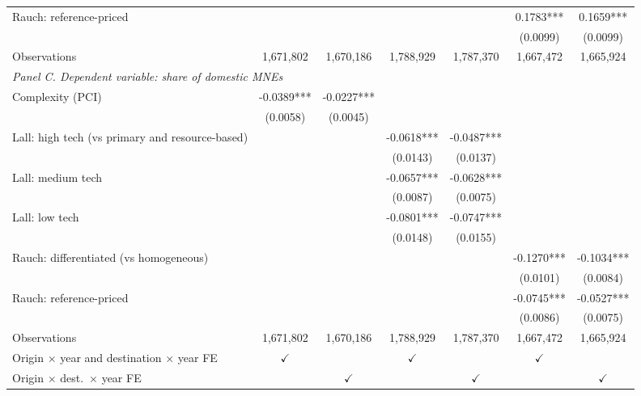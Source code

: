 \begin{tabular}{lcccccc}
Rauch: reference-priced &  &  &  &  & 0.1783*** & 0.1659*** \\
 &  &  &  &  & (0.0099) & (0.0099) \\
Observations & 1,671,802 & 1,670,186 & 1,788,929 & 1,787,370 & 1,667,472 & 1,665,924 \\
\midrule
\multicolumn{7}{l}{\textit{Panel C. Dependent variable: share of domestic MNEs}} \\
Complexity (PCI) & -0.0389*** & -0.0227*** &  &  &  &  \\
 & (0.0058) & (0.0045) &  &  &  &  \\
Lall: high tech (vs primary and resource-based) &  &  & -0.0618*** & -0.0487*** &  &  \\
 &  &  & (0.0143) & (0.0137) &  &  \\
Lall: medium tech &  &  & -0.0657*** & -0.0628*** &  &  \\
 &  &  & (0.0087) & (0.0075) &  &  \\
Lall: low tech &  &  & -0.0801*** & -0.0747*** &  &  \\
 &  &  & (0.0148) & (0.0155) &  &  \\
Rauch: differentiated (vs homogeneous) &  &  &  &  & -0.1270*** & -0.1034*** \\
 &  &  &  &  & (0.0101) & (0.0084) \\
Rauch: reference-priced &  &  &  &  & -0.0745*** & -0.0527*** \\
 &  &  &  &  & (0.0086) & (0.0075) \\
Observations & 1,671,802 & 1,670,186 & 1,788,929 & 1,787,370 & 1,667,472 & 1,665,924 \\
\hline
Origin $\times$ year and destination $\times$ year FE & $\checkmark$ &  & $\checkmark$ &  & $\checkmark$ &  \\
Origin $\times$ dest.\ $\times$ year FE &  & $\checkmark$ &  & $\checkmark$ &  & $\checkmark$ \\
\hline
\end{tabular}
